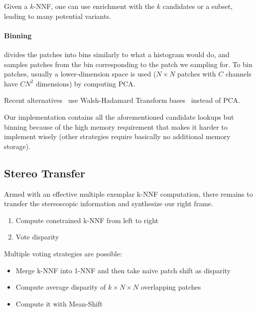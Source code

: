 Given a $k$-NNF, one can use enrichment with the $k$ candidates or a subset, leading to many potential variants.

\paragraph{Binning} divides the patches into bins similarly to what a histogram would do, and samples patches from the bin corresponding to the patch we sampling for.
To bin patches, usually a lower-dimension space is used ($N\times N$ patches with $C$ channels have $CN^2$ dimensions) by computing PCA.

Recent alternatives~\cite{He12} use Walsh-Hadamard Transform bases~\cite{Hel05} instead of PCA.

Our implementation contains all the aforementioned candidate lookups but binning because of the high memory requirement that makes it harder to implement wisely (other strategies require basically no additional memory storage).

\subsection{Stereo Transfer}
\label{sec:transfer}
Armed with an effective multiple exemplar k-NNF computation, there remains to transfer the stereoscopic information and synthesize our right frame.

\begin{enumerate}
	\item Compute constrained k-NNF from left to right
	\item Vote disparity
\end{enumerate}

Multiple voting strategies are possible:
\begin{itemize}
	\item Merge k-NNF into 1-NNF and then take naive patch shift as disparity
	\item Compute average disparity of $k \times N \times N$ overlapping patches
	\item Compute it with Mean-Shift
\end{itemize}




